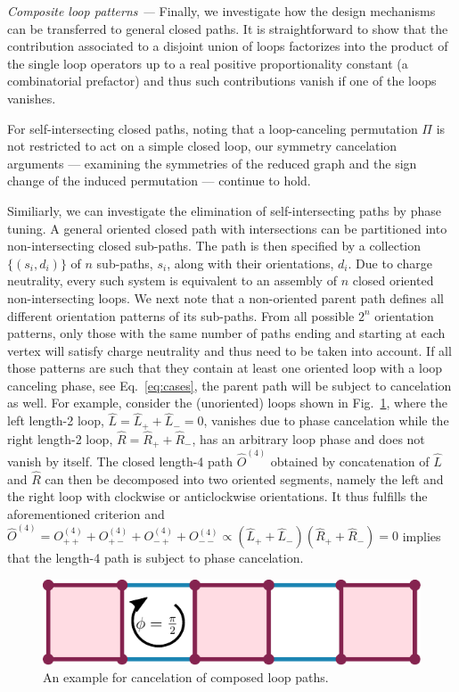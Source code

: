 \documentclass[twocolumn,floats,prx,showpacs]{revtex4-1}
\newcommand{\rein}[1]{{\color{rein} #1}}
\begin{document}
\emph{Composite loop patterns ---}
Finally, we investigate how the design mechanisms can be transferred to general closed paths. It is straightforward to show that the contribution associated to a disjoint union of loops factorizes into the product of the single loop operators up to a real positive proportionality constant (a combinatorial prefactor) and thus such contributions vanish if one of the loops vanishes. 
\rein{For self-intersecting closed paths, noting that a loop-canceling permutation $\Pi$ is not restricted to act on a simple closed loop, our
symmetry cancelation arguments --- examining the symmetries of the reduced graph and the sign change of the induced permutation --- continue to hold.

Similiarly, we can investigate the elimination of self-intersecting paths by phase tuning. A general oriented closed path with intersections can be partitioned into non-intersecting closed sub-paths. The path is then specified by a collection $\{(s_i,d_i)\}$ of $n$ sub-paths, $s_i$, along with their orientations, $d_i$.  Due to charge neutrality, every such system is equivalent to an assembly of $n$ closed oriented non-intersecting loops. We next note that a non-oriented parent path defines all different orientation patterns of its sub-paths. From all possible $2^n$ orientation patterns, only those with the same number of paths ending and starting at each vertex will satisfy charge neutrality and thus need to be taken into account. If all those patterns are such that they contain at least one oriented loop with a loop canceling phase, see Eq.~\eqref{eq:cases}, the parent path will be subject to cancelation as well. For example, consider the (unoriented) loops shown in Fig.~\ref{fig:compose}, where the left length-2 loop, $\hat L= \hat L_+ + \hat L_-=0$, vanishes due to phase cancelation while the right length-2 loop, $\hat R=\hat R_+ + \hat R_-$, has an arbitrary loop phase and does not vanish by itself. The closed length-4 path $\hat O^{(4)}$ obtained by concatenation of $\hat L$ and $\hat R$ can then be decomposed into two oriented segments, namely the left and the right loop with clockwise or anticlockwise orientations. It thus fulfills the aforementioned criterion and $\hat O^{(4)}=O^{(4)}_{++}+O^{(4)}_{+-}+O^{(4)}_{-+}+O^{(4)}_{--} \propto (\hat L_+ + \hat L_-)(\hat R_+ + \hat R_-)=0$ implies that the length-4 path is subject to phase cancelation.
}

\begin{figure}
\includegraphics[width=0.72 \columnwidth]{fig/compose.pdf}
\caption{An example for cancelation of composed loop paths.}
\label{fig:compose}
\end{figure}
\end{document}

